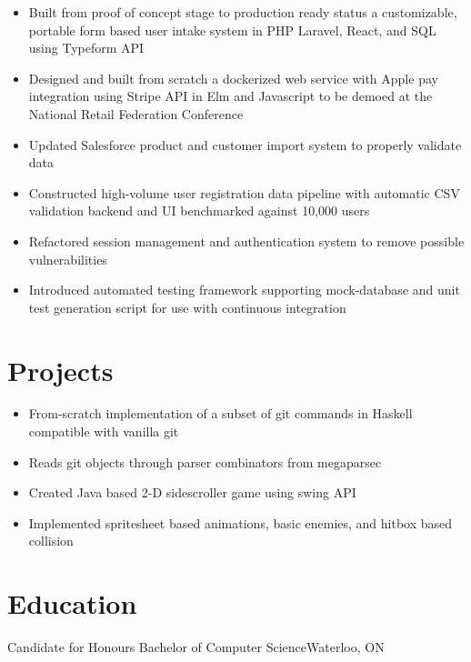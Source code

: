 \documentclass{simple_resume}
\begin{document}
\begin{itemize}
  \item{Built from proof of concept stage to production ready status a customizable, portable form based user intake system in PHP Laravel, React, and SQL using Typeform API}
  \item{Designed and built from scratch a dockerized web service with Apple pay integration using Stripe API in Elm and Javascript to be demoed at the National Retail Federation Conference}
  \item{Updated Salesforce product and customer import system to properly validate data}
\end{itemize}


\begin{itemize}
  \item{Constructed high-volume user registration data pipeline with automatic CSV validation backend and UI benchmarked against 10,000 users}
  \item{Refactored session management and authentication system to remove possible vulnerabilities}
  \item{Introduced automated testing framework supporting mock-database and unit test generation script for use with continuous integration}
\end{itemize}

\section{Projects}
\begin{itemize}
  \item From-scratch implementation of a subset of git commands in Haskell
  compatible with vanilla git
  \item Reads git objects through parser combinators from megaparsec
\end{itemize}

\begin{itemize}
  \item{Created Java based 2-D sidescroller game using swing API}
  \item{Implemented spritesheet based animations, basic enemies, and hitbox based collision}
\end{itemize}

\section{Education}
{Candidate for Honours Bachelor of Computer Science}{Waterloo, ON}
\end{document}
